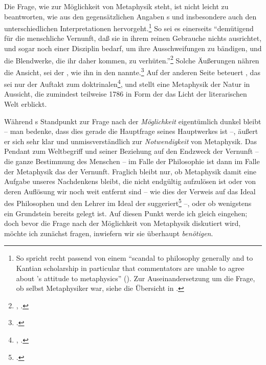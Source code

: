 Die Frage, wie  zur Möglichkeit von Metaphysik steht, ist
nicht leicht zu beantworten, wie aus den gegensätzlichen Angaben
s und insbesondere auch den unterschiedlichen
Interpretationen hervorgeht.\footnote{So spricht  recht
passend von einem \enquote{scandal to philosophy generally and to Kantian scholarship in
particular that commentators are unable to agree about 's
attitude to metaphysics} (\cite[][372]{Walsh:KantandMetaphysics1976}). Zur
Auseinandersetzung um die Frage, ob  selbst Metaphysiker
war, siehe die Übersicht in
\cite{Funke:DieDiskussionumdiemetaphysischeKantinterpretation1976}.} So sei es
einerseits \enquote{demütigend für die menschliche Vernunft, daß sie in ihrem
reinen Gebrauche nichts ausrichtet, und sogar noch einer Disziplin bedarf, um
ihre Ausschweifungen zu bändigen, und die Blendwerke, die ihr daher kommen, zu
verhüten.}\footnote{\cite[][B 823]{Kant:KritikderreinenVernunft2003},
\cite[][III: 517.4--7]{Kant:GesammelteWerke1900ff.}.} Solche Äußerungen nähren
die Ansicht,  sei der , wie  ihn in den
nannte.\footnote{\cite[Vgl.][Vorbericht]{Mendelssohn:MorgenstundenoderVorlesungenueberdasDaseynGottes1785}.} Auf der anderen Seite beteuert , das  sei nur der Auftakt zum
doktrinalen\footnote{\cite[Vgl.][B x]{Kant:KritikderUrteilskraft2009},
\cite[][V: 170.20--22]{Kant:GesammelteWerke1900ff.}.}, und stellt eine
Metaphysik der Natur in Aussicht, die zumindest teilweise 1786 in Form der  das Licht der literarischen Welt erblickt.

Während s
Standpunkt zur Frage nach der \emph{Möglichkeit} eigentümlich dunkel bleibt --
man bedenke, dass dies gerade die Hauptfrage seines Hauptwerkes ist --, äußert
er sich sehr klar und unmissverständlich zur \emph{Notwendigkeit} von
Metaphysik. Das Pendant zum Weltbegriff und seiner Beziehung auf den
Endzweck der Vernunft -- die ganze Bestimmung des Menschen -- im Falle der
Philosophie ist dann im Falle der Metaphysik das  der
Vernunft. Fraglich bleibt nur, ob Metaphysik damit eine Aufgabe unseres
Nachdenkens bleibt, die nicht endgültig aufzulösen ist oder von deren Auflösung
wir noch weit entfernt sind -- wie dies der Verweis auf das Ideal des
Philosophen und den Lehrer im Ideal der 
suggeriert\footnote{\cite[Vgl.][B 866\,f.,]{Kant:KritikderreinenVernunft2003}
\cite[][III: 542.19-542.37]{Kant:GesammelteWerke1900ff.}.} --, oder ob
wenigstens ein Grundstein bereits gelegt ist. Auf diesen Punkt werde ich gleich
eingehen; doch bevor die Frage nach der Möglichkeit von Metaphysik diskutiert
wird, möchte ich zunächst fragen, inwiefern wir sie überhaupt \emph{benötigen}.


